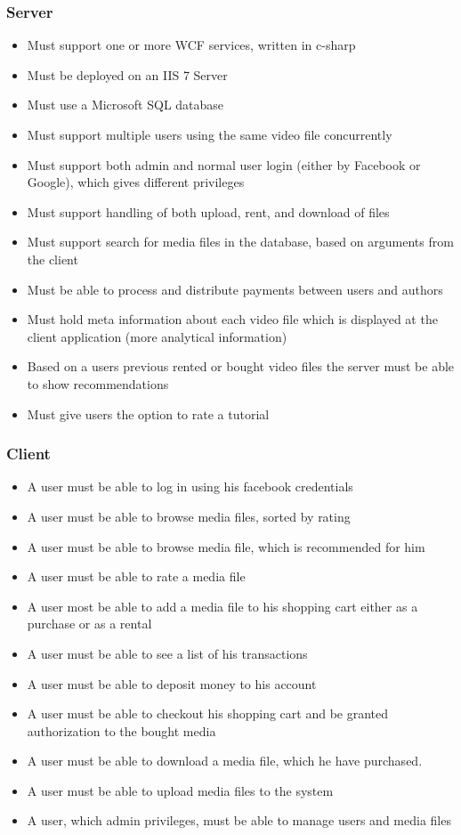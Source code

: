 \subsubsection{Server}
\begin{itemize}
\item Must support one or more WCF services, written in c-sharp
\item Must be deployed on an IIS 7 Server
\item Must use a Microsoft SQL database
\item Must support multiple users using the same video file concurrently
\item Must support both admin and normal user login (either by Facebook or Google), which gives different privileges
\item Must support handling of both upload, rent, and download of files
\item Must support search for media files in the database, based on arguments from the client
\item Must be able to process and distribute payments between users and authors
\item Must hold meta information about each video file which is displayed at the client application (more analytical information)
\item Based on a users previous rented or bought video files the server must be able to show recommendations
\item Must give users the option to rate a tutorial
\end{itemize}

\subsubsection{Client}
\begin{itemize}
	\item A user must be able to log in using his facebook credentials
	\item A user must be able to browse media files, sorted by rating
	\item A user must be able to browse media file, which is recommended for him
	\item A user must be able to rate a media file
	\item A user most be able to add a media file to his shopping cart either as a purchase or as a rental
	\item A user must be able to see a list of his transactions
	\item A user must be able to deposit money to his account
	\item A user must be able to checkout his shopping cart and be granted authorization to the bought media
	\item A user must be able to download a media file, which he have purchased. 
	\item A user must be able to upload media files to the system
	\item A user, which admin privileges, must be able to manage users and media files 
\end{itemize}
